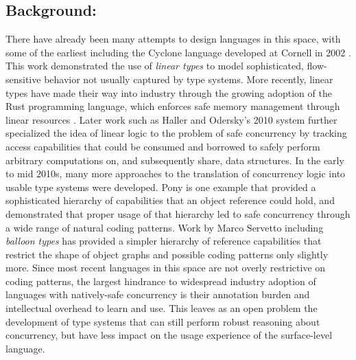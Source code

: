 \documentclass{nsf-grfp}
\begin{document}
\subsection*{Background:} There have already been many attempts to design languages in this space, with some of the earliest including the Cyclone language developed at Cornell in 2002 \cite{cyclone}. This work demonstrated the use of \textit{linear types} to model sophisticated, flow-sensitive behavior not usually captured by type systems. More recently, linear types have made their way into industry through the growing adoption of the Rust programming language, which enforces safe memory management through linear resources \cite{rust}. Later work such as Haller and Odersky's 2010 system \cite{haller odersky} further specialized the idea of linear logic to the problem of safe concurrency by tracking access capabilities that could be consumed and borrowed to safely perform arbitrary computations on, and subsequently share, data structures. In the early to mid 2010s, many more approaches to the translation of concurrency logic into usable type systems were developed. Pony \cite{pony} is one example that provided a sophisticated hierarchy of capabilities that an object reference could hold, and demonstrated that proper usage of that hierarchy led to safe concurrency through a wide range of natural coding patterns. Work by Marco Servetto including \textit{balloon types} \cite{balloon types} has provided a simpler hierarchy of reference capabilities that restrict the shape of object graphs and possible coding patterns only slightly more. Since most recent languages in this space are not overly restrictive on coding patterns, the largest hindrance to widespread industry adoption of languages with natively-safe concurrency is their annotation burden and intellectual overhead to learn and use. This leaves as an open problem the development of type systems that can still perform robust reasoning about concurrency, but have less impact on the usage experience of the surface-level language.
\end{document}
